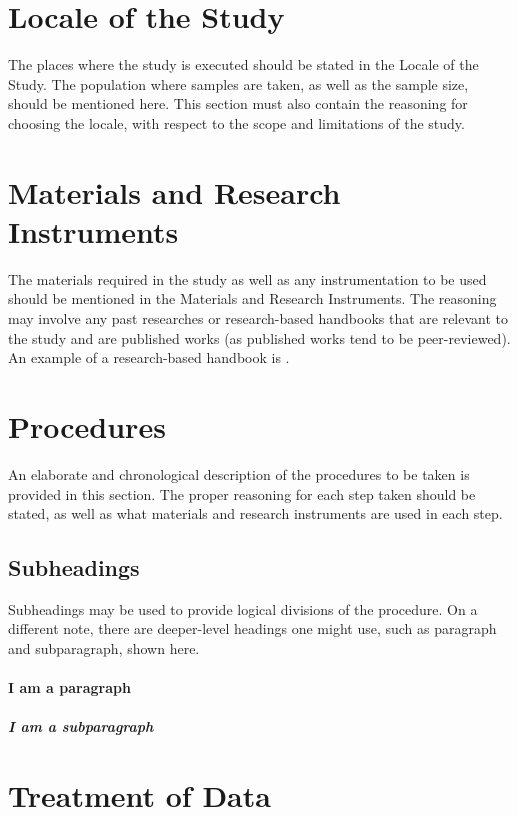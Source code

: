 \documentclass{strrespaper-trad}
\begin{document}
		\section{Locale of the Study}
			The places where the study is executed should be stated in the Locale of the Study.
			The population where samples are taken, as well as the sample size, should be mentioned here.
			This section must also contain the reasoning for choosing the locale, with respect to the scope and limitations of the study.

		\section{Materials and Research Instruments}
			The materials required in the study as well as any instrumentation to be used should be mentioned in the Materials and Research Instruments.
			The reasoning may involve any past researches or research-based handbooks that are relevant to the study and are published works (as published works tend to be peer-reviewed).
			An example of a research-based handbook is \textcite{letcherWindEnergyEngineering2017}.

		\section{Procedures}
			An elaborate and chronological description of the procedures to be taken is provided in this section.
			The proper reasoning for each step taken should be stated, as well as what materials and research instruments are used in each step.
			\subsection{Subheadings}
				Subheadings may be used to provide logical divisions of the procedure.
				On a different note, there are deeper-level headings one might use, such as paragraph and subparagraph, shown here.
				\paragraph{I am a paragraph}
					\blindtext
					\subparagraph{I am a subparagraph}
						\blindtext


		\section{Treatment of Data}
\end{document}
